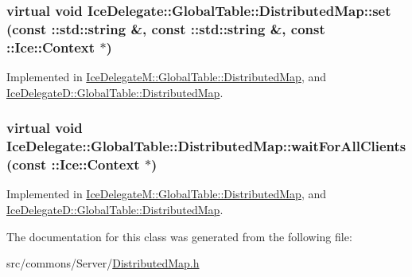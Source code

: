 \hypertarget{class_ice_delegate_1_1_global_table_1_1_distributed_map_ab61ffb89d4f5e7aed0c9ef26db2cf08c}{
\subsubsection[{set}]{\setlength{\rightskip}{0pt plus 5cm}virtual void IceDelegate::GlobalTable::DistributedMap::set (const ::std::string \&, \/  const ::std::string \&, \/  const ::Ice::Context $\ast$)}}
\label{class_ice_delegate_1_1_global_table_1_1_distributed_map_ab61ffb89d4f5e7aed0c9ef26db2cf08c}


Implemented in \hyperlink{class_ice_delegate_m_1_1_global_table_1_1_distributed_map_a0b04a83967513107ea86902bd22d57e1}{IceDelegateM::GlobalTable::DistributedMap}, and \hyperlink{class_ice_delegate_d_1_1_global_table_1_1_distributed_map_a0045800989d60d663a5fdfdb1735cd7a}{IceDelegateD::GlobalTable::DistributedMap}.

\hypertarget{class_ice_delegate_1_1_global_table_1_1_distributed_map_ad589c12e7d1d78e40769d30fc9d485c9}{
\subsubsection[{waitForAllClients}]{\setlength{\rightskip}{0pt plus 5cm}virtual void IceDelegate::GlobalTable::DistributedMap::waitForAllClients (const ::Ice::Context $\ast$)}}
\label{class_ice_delegate_1_1_global_table_1_1_distributed_map_ad589c12e7d1d78e40769d30fc9d485c9}


Implemented in \hyperlink{class_ice_delegate_m_1_1_global_table_1_1_distributed_map_aca44b83949cf990bca5020ef81041635}{IceDelegateM::GlobalTable::DistributedMap}, and \hyperlink{class_ice_delegate_d_1_1_global_table_1_1_distributed_map_ab0e09c703e60b2822ae949361e2fe627}{IceDelegateD::GlobalTable::DistributedMap}.



The documentation for this class was generated from the following file:\begin{DoxyCompactItemize}
\item 
src/commons/Server/\hyperlink{_distributed_map_8h}{DistributedMap.h}\end{DoxyCompactItemize}
